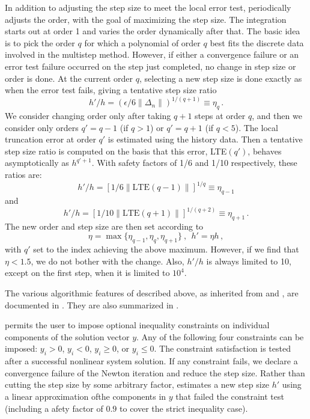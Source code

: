In addition to adjusting the step size to meet the local error test,
{\cvode} periodically adjusts the order, with the goal of maximizing the
step size.  The integration starts out at order 1 and varies the order
dynamically after that.  The basic idea is to pick the order $q$ for
which a polynomial of order $q$ best fits the discrete data involved
in the multistep method.  However, if either a convergence failure or
an error test failure occurred on the step just completed, no change
in step size or order is done.  At the current order $q$, selecting a
new step size is done exactly as when the error test fails, giving a
tentative step size ratio
\[ h'/h = (\epsilon / 6 \|\Delta_n\| )^{1/(q+1)} \equiv \eta_q \, . \]
We consider changing order only after taking $q+1$ steps at order $q$,
and then we consider only orders $q' = q - 1$ (if $q > 1$) or
$q' = q + 1$ (if $q < 5$).  The local truncation error at order $q'$
is estimated using the history data.  Then a tentative step size ratio
is computed on the basis that this error, LTE$(q')$, behaves
asymptotically as $h^{q'+1}$.  With safety factors of 1/6 and
1/10 respectively, these ratios are:
\[ h'/h = [1 / 6 \|\mbox{LTE}(q-1)\| ]^{1/q} \equiv \eta_{q-1} \]
and
\[ h'/h = [1 / 10 \|\mbox{LTE}(q+1)\| ]^{1/(q+2)} \equiv \eta_{q+1} \, . \]
The new order and step size are then set according to
\[ \eta = \max\{\eta_{q-1},\eta_q,\eta_{q+1}\} ~,~~ h' = \eta h \, , \]
with $q'$ set to the index achieving the above maximum.
However, if we find that $\eta < 1.5$, we do not bother with the
change.  Also, $h'/h$ is always limited to 10, except on the first
step, when it is limited to $10^4$.

The various algorithmic features of {\cvodes} described above, as
inherited from {\vode} and {\vodpk}, are documented in 
\cite{BBH:89,Byr:92,Hin:00}.  They are also summarized in
\cite{HBGLSSW:05}.

{\cvodes} permits the user to impose optional inequality constraints on individual
components of the solution vector $y$. Any of the following four constraints
can be imposed: $y_i > 0$, $y_i < 0$, $y_i \geq 0$, or $y_i \leq 0$.
The constraint satisfaction is tested after a successful nonlinear system solution.
If any constraint fails, we declare a convergence failure of the Newton iteration
and reduce the step size. Rather than cutting the step size by some arbitrary factor,
{\cvodes} estimates a new step size $h'$ using a linear approximation ofthe components
in $y$ that failed the constraint test (including a afety factor of $0.9$ to
cover the strict inequality case).

